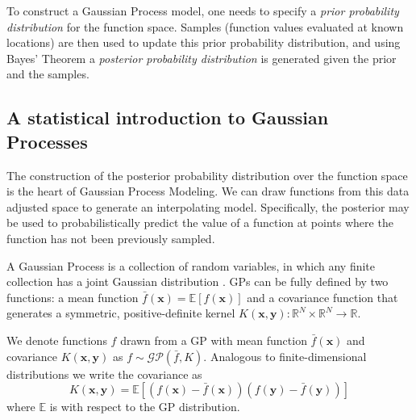 \documentclass{article}%
\begin{document}
To construct a Gaussian Process model, one needs to specify a \textit{prior probability distribution} for
 the function space. Samples (function values evaluated at known locations)
are then used to update this prior probability distribution, and using Bayes' Theorem a \textit{posterior probability
distribution} is generated given the prior and the samples.

\subsection{A statistical introduction to Gaussian Processes}

The construction of the posterior probability distribution over the function space is the heart of
Gaussian Process Modeling. We can draw functions from this data adjusted space to generate an interpolating model.
 Specifically, the posterior may be used to probabilistically predict the value of a function at points where the
function has not been previously sampled.

A Gaussian Process is a collection of random variables, in which any finite collection has a joint Gaussian distribution
\cite{Rasmussen2005}\cite{pattern}.
GPs can be fully defined by two functions:
 a mean function $\bar{f}(\mathbf{x}) = \mathbb{E}[f(\mathbf{x})]$ and a
 covariance function that generates a symmetric, positive-definite kernel
 $K(\mathbf{x}, \mathbf{y}): \mathbb{R}^N\times\mathbb{R}^N \to \mathbb{R}$.

We denote functions $f$ drawn from a GP with mean function $\bar{f}(\mathbf{x})$ and covariance
$K(\mathbf{x}, \mathbf{y})$ as $f\sim \mathcal{GP}(\bar{f}, K)$. Analogous to finite-dimensional
distributions we write the covariance as
\begin{equation} 
K(\mathbf{x}, \mathbf{y}) = \mathbb{E}\left[\left(f(\mathbf{x}) - \bar{f}(\mathbf{x})\right)
\left(f(\mathbf{y}) - \bar{f}(\mathbf{y})\right)\right]
\end{equation}
where $\mathbb{E}$ is with respect to the GP distribution.
\end{document}
